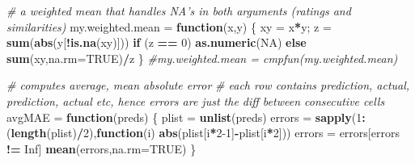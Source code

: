 \documentclass[]{article}
\newenvironment{Shaded}{\begin{snugshade}}{\end{snugshade}}
\newcommand{\CommentTok}[1]{\textcolor[rgb]{0.56,0.35,0.01}{\textit{#1}}}
\newcommand{\ControlFlowTok}[1]{\textcolor[rgb]{0.13,0.29,0.53}{\textbf{#1}}}
\newcommand{\DataTypeTok}[1]{\textcolor[rgb]{0.13,0.29,0.53}{#1}}
\newcommand{\DecValTok}[1]{\textcolor[rgb]{0.00,0.00,0.81}{#1}}
\newcommand{\KeywordTok}[1]{\textcolor[rgb]{0.13,0.29,0.53}{\textbf{#1}}}
\newcommand{\NormalTok}[1]{#1}
\newcommand{\OperatorTok}[1]{\textcolor[rgb]{0.81,0.36,0.00}{\textbf{#1}}}
\newcommand{\OtherTok}[1]{\textcolor[rgb]{0.56,0.35,0.01}{#1}}
\newcommand{\StringTok}[1]{\textcolor[rgb]{0.31,0.60,0.02}{#1}}
\begin{document}
\begin{Shaded}
\begin{Highlighting}[]
\CommentTok{# a weighted mean that handles NA's in both arguments (ratings and similarities)}
\NormalTok{my.weighted.mean =}\StringTok{ }\ControlFlowTok{function}\NormalTok{(x,y) \{}
\NormalTok{    xy =}\StringTok{ }\NormalTok{x}\OperatorTok{*}\NormalTok{y; }
\NormalTok{    z =}\StringTok{ }\KeywordTok{sum}\NormalTok{(}\KeywordTok{abs}\NormalTok{(y[}\OperatorTok{!}\KeywordTok{is.na}\NormalTok{(xy)]))}
    \ControlFlowTok{if}\NormalTok{ (z }\OperatorTok{==}\StringTok{ }\DecValTok{0}\NormalTok{) }\KeywordTok{as.numeric}\NormalTok{(}\OtherTok{NA}\NormalTok{) }\ControlFlowTok{else} \KeywordTok{sum}\NormalTok{(xy,}\DataTypeTok{na.rm=}\OtherTok{TRUE}\NormalTok{)}\OperatorTok{/}\NormalTok{z }
\NormalTok{\}}
\CommentTok{#my.weighted.mean = cmpfun(my.weighted.mean)}

\CommentTok{# computes average, mean absolute error}
\CommentTok{# each row contains prediction, actual, prediction, actual etc, hence errors are just the diff between consecutive cells}
\NormalTok{avgMAE =}\StringTok{ }\ControlFlowTok{function}\NormalTok{(preds) \{}
\NormalTok{  plist =}\StringTok{ }\KeywordTok{unlist}\NormalTok{(preds)}
\NormalTok{  errors =}\StringTok{ }\KeywordTok{sapply}\NormalTok{(}\DecValTok{1}\OperatorTok{:}\NormalTok{(}\KeywordTok{length}\NormalTok{(plist)}\OperatorTok{/}\DecValTok{2}\NormalTok{),}\ControlFlowTok{function}\NormalTok{(i) }\KeywordTok{abs}\NormalTok{(plist[i}\OperatorTok{*}\DecValTok{2-1}\NormalTok{]}\OperatorTok{-}\NormalTok{plist[i}\OperatorTok{*}\DecValTok{2}\NormalTok{]))}
\NormalTok{  errors =}\StringTok{ }\NormalTok{errors[errors }\OperatorTok{!=}\StringTok{ }\OtherTok{Inf}\NormalTok{]}
  \KeywordTok{mean}\NormalTok{(errors,}\DataTypeTok{na.rm=}\OtherTok{TRUE}\NormalTok{)}
\NormalTok{\}}


\end{Highlighting}
\end{Shaded}
\end{document}
